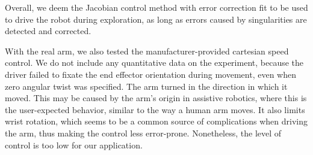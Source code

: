 \documentclass[buriama8_dp.tex]{subfiles}
\begin{document}
Overall, we deem the Jacobian control method with error correction fit to be used to drive the robot during exploration, as long as errors caused by singularities are detected and corrected.

With the real arm, we also tested the manufacturer-provided cartesian speed control. We do not include any quantitative data on the experiment, because the driver failed to fixate the end effector orientation during movement, even when zero angular twist was specified. The arm turned in the direction in which it moved. This may be caused by the arm's origin in assistive robotics, where this is the user-expected behavior, similar to the way a human arm moves. It also limits wrist rotation, which seems to be a common source of complications when driving the arm, thus making the control less error-prone. Nonetheless, the level of control is too low for our application.
\end{document}
